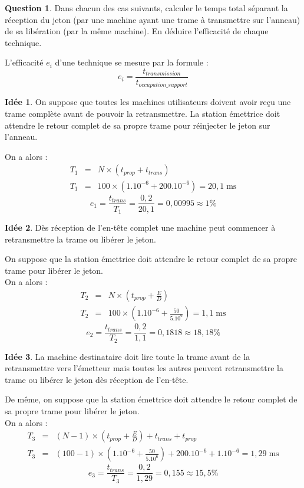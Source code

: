 \documentclass[11pt,english,french]{scrreprt}
\theoremstyle{remark}
\theoremstyle{definition}
\newtheorem{ques}{Question}[section]
\newtheorem{idee}{Idée}[ques]
\begin{document}
\begin{ques}
	Dans chacun des cas suivants, calculer le temps total séparant la réception du jeton (par une machine ayant une trame à transmettre sur l'anneau) de sa libération (par la même machine). En déduire l'efficacité de chaque technique.
	
	L'efficacité $e_i$ d'une technique se mesure par la formule :\[e_i = \frac{t_{transmission}}{t_{occupation\_support}}\]
	\begin{idee}
		On suppose que toutes les machines utilisateurs doivent avoir reçu une trame complète avant de pouvoir la retransmettre. La station émettrice doit attendre le retour complet de sa propre trame pour réinjecter le jeton sur l'anneau.
		
		On a alors : 
		\begin{eqnarray*}
		T_{1} & = & N\times\left(t_{prop}+t_{trans}\right)\\
		T_{1} & = & 100\times\left(1.10^{-6}+200.10^{-6}\right)=20,1\;\textrm{ms}
		\end{eqnarray*}
		\[e_1 = \frac{t_{trans}}{T_1} = \frac{0,2}{20,1} = 0,00995\approx 1\%\]
	\end{idee}
	
	\begin{idee}\label{ques:3.b}
		Dès réception de l'en-tête complet une machine peut commencer à retransmettre la trame ou libérer le jeton.
		
		On suppose que la station émettrice doit attendre le retour complet de sa propre trame pour libérer le jeton.\\
		On a alors :
		\begin{eqnarray*}
		T_{2} & = & N\times\left(t_{prop}+\frac{E}{D}\right)\\
		T_{2} & = & 100\times\left(1.10^{-6}+\frac{50}{5.10^{6}}\right)=1,1\;\textrm{ms}
		\end{eqnarray*}
		\[e_2 = \frac{t_{trans}}{T_2} = \frac{0,2}{1,1} = 0,1818 \approx 18,18\%\]
	\end{idee}
	
	\begin{idee}\label{ques:3.c}
		La machine destinataire doit lire toute la trame avant de la retransmettre vers l'émetteur mais toutes les autres peuvent retransmettre la trame ou libérer le jeton dès réception de l'en-tête.
		
		De même, on suppose que la station émettrice doit attendre le retour complet de sa propre trame pour libérer le jeton.\\
		On a alors :
		\begin{eqnarray*}
		T_{3} & = & (N-1)\times\left(t_{prop}+\frac{E}{D}\right)+t_{trans}+t_{prop}\\
		T_{3} & = & (100-1)\times\left(1.10^{-6}+\frac{50}{5.10^{6}}\right)+200.10^{-6}+1.10^{-6}=1,29\;\textrm{ms}
		\end{eqnarray*}
		\[e_3 = \frac{t_{trans}}{T_3} = \frac{0,2}{1,29} = 0,155\approx 15,5\%\]
	\end{idee}
\end{ques}
\end{document}
